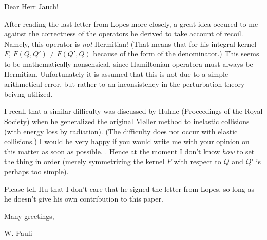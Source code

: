 \date{August 22, 1944}

Dear Herr Jauch!

After reading the last letter from Lopes more closely, a great idea occured to me against the correctness of the operators he derived to take account of recoil. Namely, this operator is \textit{not} Hermitian! (That means that for his integral kernel $F$, $F(Q, Q') \neq F(Q', Q)$ because of the form of the denominator.) This seems to be mathematically nonsensical, since Hamiltonian operatora must always be Hermitian. Unfortunately it is assumed that this is not due to a simple arithmetical error, but rather to an inconsistency in the perturbation theory beivng utilized.


I recall that a similar difficulty was discussed by Hulme (Proceedings of the Royal Society) when he generalized the original Møller method to inelastic collisions (with energy loss by radiation). (The difficulty does not occur with elastic collisions.) I would be very happy if you would write me with your opinion on this matter as soon as possible. . Hence at the moment I don't know \textit{how} to set the thing in order (merely symmetrizing the kernel $F$ with respect to $Q$ and $Q'$ is perhaps too simple).

Please tell Hu that I don't care that he signed the letter from Lopes, so long as he doesn't give his own contribution to this paper. 

Many greetings,

W. Pauli

